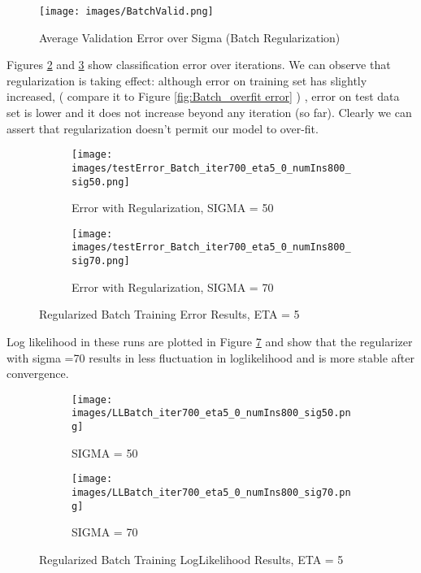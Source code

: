\documentclass[a4paper,11pt]{article}
\begin{document}
\begin{figure}[b]
  \texttt{[image: images/BatchValid.png]}
	\centering
  \caption{Average Validation Error over Sigma (Batch Regularization)}
  \label{fig:ValidBatch_reg}
\end{figure}
\newpage
Figures \ref{fig:Batch_reg_sig50_er} and \ref{fig:Batch_reg_sig70_er} show classification error over iterations. We can observe that regularization is taking effect: although error on training set has slightly increased, ( compare it to Figure \ref{fig:Batch_overfit error} ) , error on test data set is lower and it does not increase beyond any iteration (so far). Clearly we can assert that regularization doesn't permit our model to over-fit. 
\begin{figure}[t]
\begin{subfigure}{.5\textwidth}
  \texttt{[image: images/testError\_Batch\_iter700\_eta5\_0\_numIns800\_sig50.png]}
	\centering
  \caption{Error with Regularization, SIGMA = 50 }
  \label{fig:Batch_reg_sig50_er}
\end{subfigure}
\begin{subfigure}{.5\textwidth}
  \texttt{[image: images/testError\_Batch\_iter700\_eta5\_0\_numIns800\_sig70.png]}
	\centering
  \caption{Error with Regularization, SIGMA = 70 }
  \label{fig:Batch_reg_sig70_er}
\end{subfigure}
  \caption{Regularized Batch Training Error Results, ETA = 5}
  \label{fig:BatchReg}
\end{figure}
Log likelihood in these runs are plotted in Figure \ref{fig:LLBatchReg} and show that the regularizer with sigma =70 results in less fluctuation in loglikelihood and is more stable after convergence. 
\begin{figure}[t]
\begin{subfigure}{.5\textwidth}
  \texttt{[image: images/LLBatch\_iter700\_eta5\_0\_numIns800\_sig50.png]}
	\centering
  \caption{ SIGMA = 50 }
  \label{fig:Batch_reg_sig50_LL}
\end{subfigure}
\begin{subfigure}{.5\textwidth}
  \texttt{[image: images/LLBatch\_iter700\_eta5\_0\_numIns800\_sig70.png]}
	\centering
  \caption{ SIGMA = 70 }
  \label{fig:Batch_reg_sig70_LL}
\end{subfigure}
  \caption{Regularized Batch Training LogLikelihood Results, ETA = 5}
  \label{fig:LLBatchReg}
\end{figure}
\end{document}
